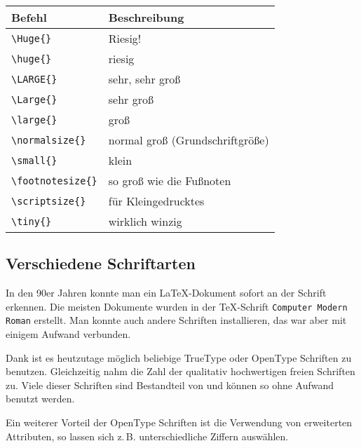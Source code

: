 \begin{center} 
\begin{tabular}{ll}
          Befehl &      Beschreibung \\
          \hline
 \lstinline/\Huge{}/        &   \Huge{Riesig!} \\
 \lstinline/\huge{}/        &   \Huge{riesig} \\
 \lstinline/\LARGE{}/       &   \LARGE{sehr, sehr groß} \\
 \lstinline/\Large{}/       &   \Large{sehr groß} \\
 \lstinline/\large{}/       &   \large{groß} \\
 \lstinline/\normalsize{}/  &   \normalsize{normal groß (Grundschriftgröße)} \\
 \lstinline/\small{}/       &   \small{klein} \\
 \lstinline/\footnotesize{}/    &   \footnotesize{so groß wie die Fußnoten} \\
 \lstinline/\scriptsize{}/  &   \scriptsize{für Kleingedrucktes} \\
 \lstinline/\tiny{}/        &   \tiny{wirklich winzig} \\
\end{tabular}
\end{center}

\subsection{Verschiedene Schriftarten}

\label{sec:normale-schriften}

In den 90er Jahren konnte man ein \LaTeX-Dokument sofort an der Schrift erkennen.
Die meisten Dokumente wurden in der \TeX-Schrift \texttt{Computer Modern Roman} erstellt.
Man konnte auch andere Schriften installieren, das war aber mit einigem Aufwand verbunden.

Dank \LuaLaTeX{} ist es heutzutage möglich beliebige TrueType oder OpenType Schriften zu benutzen.
Gleichzeitig nahm die Zahl der qualitativ hochwertigen freien Schriften zu.
Viele dieser Schriften sind Bestandteil von \TeXLive{} und können so ohne Aufwand benutzt werden.

Ein weiterer Vorteil der OpenType Schriften ist die Verwendung von erweiterten Attributen, 
so lassen sich z.\,B. unterschiedliche Ziffern auswählen.

\newfontfamily{}
\newfontfamily{}
\newfontfamily{}
\newfontfamily{}

